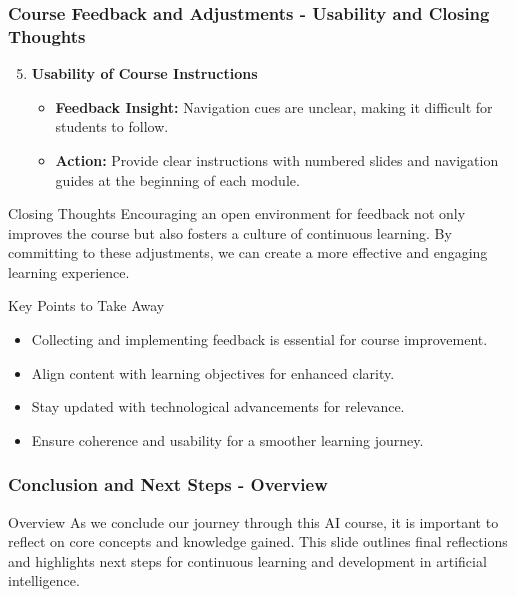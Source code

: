 \documentclass[aspectratio=169]{beamer}
\begin{document}
\begin{frame}[fragile]
    \frametitle{Course Feedback and Adjustments - Usability and Closing Thoughts}
    \begin{enumerate}
        \setcounter{enumi}{4}
        \item \textbf{Usability of Course Instructions}
            \begin{itemize}
                \item \textbf{Feedback Insight:} Navigation cues are unclear, making it difficult for students to follow.
                \item \textbf{Action:} Provide clear instructions with numbered slides and navigation guides at the beginning of each module.
            \end{itemize}
    \end{enumerate}

    \begin{block}{Closing Thoughts}
    Encouraging an open environment for feedback not only improves the course but also fosters a culture of continuous learning. 
    By committing to these adjustments, we can create a more effective and engaging learning experience.
    \end{block}

    \begin{block}{Key Points to Take Away}
    \begin{itemize}
        \item Collecting and implementing feedback is essential for course improvement.
        \item Align content with learning objectives for enhanced clarity.
        \item Stay updated with technological advancements for relevance.
        \item Ensure coherence and usability for a smoother learning journey.
    \end{itemize}
    \end{block}
\end{frame}

\begin{frame}[fragile]
    \frametitle{Conclusion and Next Steps - Overview}
    \begin{block}{Overview}
        As we conclude our journey through this AI course, it is important to reflect on core concepts and knowledge gained. This slide outlines final reflections and highlights next steps for continuous learning and development in artificial intelligence.
    \end{block}
\end{frame}
\end{document}
